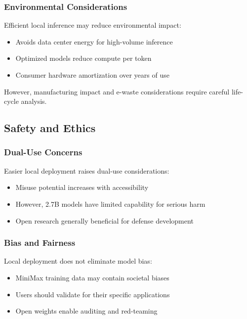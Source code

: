 \subsubsection{Environmental Considerations}

Efficient local inference may reduce environmental impact:

\begin{itemize}
    \item Avoids data center energy for high-volume inference
    \item Optimized models reduce compute per token
    \item Consumer hardware amortization over years of use
\end{itemize}

However, manufacturing impact and e-waste considerations require careful life-cycle analysis.

\subsection{Safety and Ethics}

\subsubsection{Dual-Use Concerns}

Easier local deployment raises dual-use considerations:

\begin{itemize}
    \item Misuse potential increases with accessibility
    \item However, 2.7B models have limited capability for serious harm
    \item Open research generally beneficial for defense development
\end{itemize}

\subsubsection{Bias and Fairness}

Local deployment does not eliminate model bias:

\begin{itemize}
    \item MiniMax training data may contain societal biases
    \item Users should validate for their specific applications
    \item Open weights enable auditing and red-teaming
\end{itemize}
